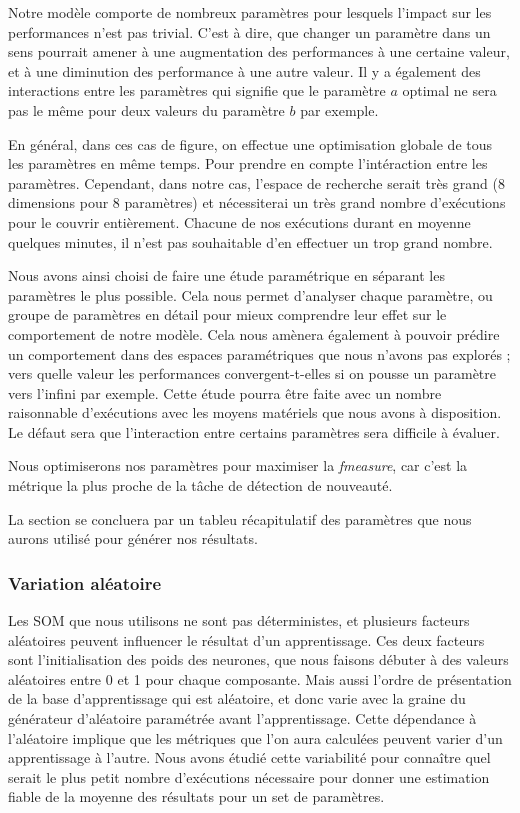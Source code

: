 	Notre modèle comporte de nombreux paramètres pour lesquels l'impact sur les performances n'est pas trivial. C'est à dire, que changer un paramètre dans un sens pourrait amener à une augmentation des performances à une certaine valeur, et à une diminution des performance à une autre valeur. Il y a également des interactions entre les paramètres qui signifie que le paramètre $a$ optimal ne sera pas le même pour deux valeurs du paramètre $b$ par exemple. 

	En général, dans ces cas de figure, on effectue une optimisation globale de tous les paramètres en même temps. Pour prendre en compte l'intéraction entre les paramètres. Cependant, dans notre cas, l'espace de recherche serait très grand (8 dimensions pour 8 paramètres) et nécessiterai un très grand nombre d'exécutions pour le couvrir entièrement. Chacune de nos exécutions durant en moyenne quelques minutes, il n'est pas souhaitable d'en effectuer un trop grand nombre.

	Nous avons ainsi choisi de faire une étude paramétrique en séparant les paramètres le plus possible. Cela nous permet d'analyser chaque paramètre, ou groupe de paramètres en détail pour mieux comprendre leur effet sur le comportement de notre modèle. Cela nous amènera également à pouvoir prédire un comportement dans des espaces paramétriques que nous n'avons pas explorés ; vers quelle valeur les performances convergent-t-elles si on pousse un paramètre vers l'infini par exemple. Cette étude pourra être faite avec un nombre raisonnable d'exécutions avec les moyens matériels que nous avons à disposition. Le défaut sera que l'interaction entre certains paramètres sera difficile à évaluer.

	Nous optimiserons nos paramètres pour maximiser la \textit{fmeasure}, car c'est la métrique la plus proche de la tâche de détection de nouveauté.
	
	La section se concluera par un tableu récapitulatif des paramètres que nous aurons utilisé pour générer nos résultats.

	\subsubsection{Variation aléatoire}

	Les SOM que nous utilisons ne sont pas déterministes, et plusieurs facteurs aléatoires peuvent influencer le résultat d'un apprentissage. Ces deux facteurs sont l'initialisation des poids des neurones, que nous faisons débuter à des valeurs aléatoires entre 0 et 1 pour chaque composante. Mais aussi l'ordre de présentation de la base d'apprentissage qui est aléatoire, et donc varie avec la graine du générateur d'aléatoire paramétrée avant l'apprentissage. Cette dépendance à l'aléatoire implique que les métriques que l'on aura calculées peuvent varier d'un apprentissage à l'autre. Nous avons étudié cette variabilité pour connaître quel serait le plus petit nombre d'exécutions nécessaire pour donner une estimation fiable de la moyenne des résultats pour un set de paramètres. 


